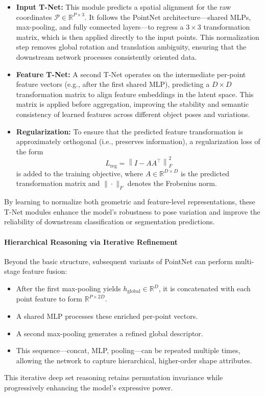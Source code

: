 \begin{itemize}
    \item \textbf{Input T-Net:} This module predicts a spatial alignment for the raw coordinates \( \mathcal{P} \in \mathbb{R}^{P \times 3} \). It follows the PointNet architecture—shared MLPs, max-pooling, and fully connected layers—to regress a \( 3 \times 3 \) transformation matrix, which is then applied directly to the input points. This normalization step removes global rotation and translation ambiguity, ensuring that the downstream network processes consistently oriented data.
    
    \item \textbf{Feature T-Net:} A second T-Net operates on the intermediate per-point feature vectors (e.g., after the first shared MLP), predicting a \( D \times D \) transformation matrix to align feature embeddings in the latent space. This matrix is applied before aggregation, improving the stability and semantic consistency of learned features across different object poses and variations.
    
    \newpage
    
    \item \textbf{Regularization:} To ensure that the predicted feature transformation is approximately orthogonal (i.e., preserves information), a regularization loss of the form
    \[
    L_{\mathrm{reg}} = \left\| I - A A^\top \right\|_F^2
    \]
    is added to the training objective, where \( A \in \mathbb{R}^{D \times D} \) is the predicted transformation matrix and \( \| \cdot \|_F \) denotes the Frobenius norm.
\end{itemize}

By learning to normalize both geometric and feature-level representations, these T-Net modules enhance the model's robustness to pose variation and improve the reliability of downstream classification or segmentation predictions.

\paragraph{Hierarchical Reasoning via Iterative Refinement}
Beyond the basic structure, subsequent variants of PointNet can perform multi-stage feature fusion:
\begin{itemize}
    \item After the first max-pooling yields \( h_{\text{global}} \in \mathbb{R}^D \), it is concatenated with each point feature to form \( \mathbb{R}^{P \times 2D} \).
    \item A shared MLP processes these enriched per-point vectors.
    \item A second max-pooling generates a refined global descriptor.
    \item This sequence—concat, MLP, pooling—can be repeated multiple times, allowing the network to capture hierarchical, higher-order shape attributes.
\end{itemize}
This iterative deep set reasoning retains permutation invariance while progressively enhancing the model’s expressive power.

